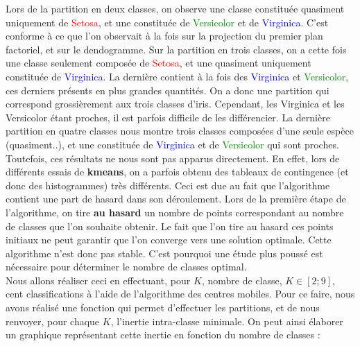 \documentclass[a4paper,11pt]{article}
\begin{document}
\noindent Lors de la partition en deux classes, on observe une classe constituée quasiment uniquement de \textcolor{red}{Setosa}, et une constituée de \textcolor{green}{Versicolor} et de \textcolor{blue}{Virginica}. C'est conforme à ce que l'on observait à la fois sur la projection du premier plan factoriel, et sur le dendogramme.
\noindent Sur la partition en trois classes, on a cette fois une classe seulement composée de \textcolor{red}{Setosa}, et une quasiment uniquement constituée de \textcolor{blue}{Virginica}. La dernière contient à la fois des \textcolor{blue}{Virginica} et \textcolor{green}{Versicolor}, ces derniers présents en plus grandes quantités. On a donc une partition qui correspond grossièrement aux trois classes d'iris. Cependant, les Virginica et les Versicolor étant proches, il est parfois difficile de les différencier.
\noindent La dernière partition en quatre classes nous montre trois classes composées d'une seule espèce (quasiment..), et une constituée de \textcolor{blue}{Virginica} et de \textcolor{green}{Versicolor} qui sont proches. \\

\noindent Toutefois, ces résultats ne nous sont pas apparus directement. En effet, lors de différents essais de \textbf{kmeans}, on a parfois obtenu des tableaux de contingence (et donc des histogrammes) très différents. Ceci est due au fait que l'algorithme contient une part de hasard dans son déroulement. Lors de la première étape de l'algorithme, on tire \textbf{au hasard} un nombre de points correspondant au nombre de classes que l'on souhaite obtenir. Le fait que l'on tire au hasard ces points initiaux ne peut garantir que l'on converge vers une solution optimale. Cette algorithme n'est donc pas stable. C'est pourquoi une étude plus poussé est nécessaire pour déterminer le nombre de classes optimal. \\

\noindent Nous allons réaliser ceci en effectuant, pour $K$, nombre de classe, $K \in [2;9]$, cent classifications à l'aide de l'algorithme des centres mobiles.
\noindent Pour ce faire, nous avons réalisé une fonction qui permet d'effectuer les partitions, et de nous renvoyer, pour chaque $K$, l'inertie intra-classe minimale. On peut ainsi élaborer un graphique représentant cette inertie en fonction du nombre de classes : 
\end{document}
